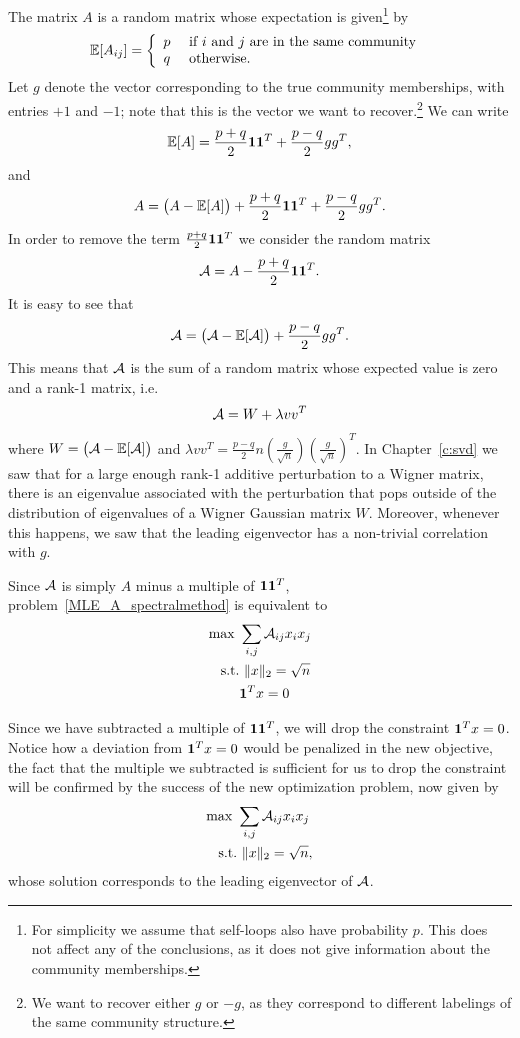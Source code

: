 The matrix $A$ is a random matrix whose expectation is given\footnote{For simplicity we assume that self-loops also have probability $p$. This does not affect any of the conclusions, as it does not give information about the community memberships.} by
\[
 \mathbb{E}[A_{ij}] =  \left\{ \begin{array}{cl} p & \text{ if $i$ and $j$ are in the same community } \\ q & \text{ otherwise.} \end{array}  \right.
\]
Let $g$ denote the vector corresponding to the true community memberships, with entries $+1$ and $-1$; note that this is the vector we want to recover.\footnote{We want to recover either $g$ or $-g$, as they correspond to different labelings of the same community structure.} We can write
\[
 \mathbb{E}[A] = \frac{p+q}2 \mathbf{1}\mathbf{1}^T +  \frac{p-q}2 gg^T,
\]
and
\[
 A = \big(A-\mathbb{E}[A]\big) +  \frac{p+q}2 \mathbf{1}\mathbf{1}^T +  \frac{p-q}2 gg^T.
\]
In order to remove the term $\frac{p+q}2 \mathbf{1}\mathbf{1}^T$ we consider the random matrix
\[
 \mathcal{A} = A - \frac{p+q}2 \mathbf{1}\mathbf{1}^T.
\]
It is easy to see that
\[
 \mathcal{A} = \big(\mathcal{A}-\mathbb{E}[\mathcal{A}]\big) +  \frac{p-q}2 gg^T.
\]
This means that $\mathcal{A}$ is the sum of a random matrix whose expected value is zero and a rank-1 matrix, i.e. $$\mathcal{A} = W + \lambda vv^T$$ where $W = \big(\mathcal{A}-\mathbb{E}[\mathcal{A}]\big)$ and $\lambda vv^T  = \frac{p-q}2n \left(\frac{g}{\sqrt{n}}\right)\left(\frac{g}{\sqrt{n}}\right)^T$. In Chapter~\ref{c:svd} we saw that for a large enough rank-1 additive perturbation to a Wigner matrix, there is an eigenvalue associated with the perturbation that pops outside of the distribution of eigenvalues of a Wigner Gaussian matrix $W$. Moreover, whenever this happens, we saw that the leading eigenvector has a non-trivial correlation with $g$. 

Since $\mathcal{A}$ is simply $A$ minus a multiple of $\mathbf{1}\mathbf{1}^T$, problem~\eqref{MLE_A_spectralmethod} is equivalent to
\begin{align}
\max\ & \sum_{i,j}\mathcal{A}_{ij}x_ix_j \nonumber\\
\text{s.t.}&\ \|x\|_2 = \sqrt{n} \label{MLE_A_spectralmethod_2}\\
 & \mathbf{1}^T x = 0 \nonumber
\end{align}

Since we have subtracted a multiple of $\mathbf{1}\mathbf{1}^T$, we will drop the constraint $\mathbf{1}^T x =0$. Notice how a deviation from $\mathbf{1}^T x =0$ would be penalized in the new objective, the fact that the multiple we subtracted is sufficient for us to drop the constraint will be confirmed by the success of the new optimization problem, now given by
\begin{align}
\max\ & \sum_{i,j}\mathcal{A}_{ij}x_ix_j \nonumber\\
\text{s.t.}&\ \|x\|_2 = \sqrt{n} \label{MLE_A_spectralmethod_22},
\end{align}
whose solution corresponds to the leading eigenvector of $\mathcal{A}$.


